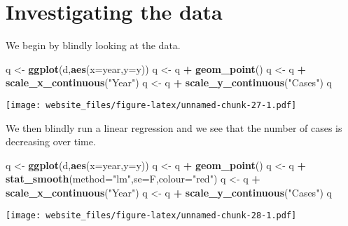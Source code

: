 \documentclass[]{book}
\newenvironment{Shaded}{\begin{snugshade}}{\end{snugshade}}
\newcommand{\KeywordTok}[1]{\textcolor[rgb]{0.13,0.29,0.53}{\textbf{#1}}}
\newcommand{\DataTypeTok}[1]{\textcolor[rgb]{0.13,0.29,0.53}{#1}}
\newcommand{\StringTok}[1]{\textcolor[rgb]{0.31,0.60,0.02}{#1}}
\newcommand{\OperatorTok}[1]{\textcolor[rgb]{0.81,0.36,0.00}{\textbf{#1}}}
\newcommand{\NormalTok}[1]{#1}
\begin{document}
\newpage

\section{Investigating the data}\label{investigating-the-data}

We begin by blindly looking at the data.

\begin{Shaded}
\begin{Highlighting}[]
\NormalTok{q <-}\StringTok{ }\KeywordTok{ggplot}\NormalTok{(d,}\KeywordTok{aes}\NormalTok{(}\DataTypeTok{x=}\NormalTok{year,}\DataTypeTok{y=}\NormalTok{y))}
\NormalTok{q <-}\StringTok{ }\NormalTok{q }\OperatorTok{+}\StringTok{ }\KeywordTok{geom_point}\NormalTok{()}
\NormalTok{q <-}\StringTok{ }\NormalTok{q }\OperatorTok{+}\StringTok{ }\KeywordTok{scale_x_continuous}\NormalTok{(}\StringTok{"Year"}\NormalTok{)}
\NormalTok{q <-}\StringTok{ }\NormalTok{q }\OperatorTok{+}\StringTok{ }\KeywordTok{scale_y_continuous}\NormalTok{(}\StringTok{"Cases"}\NormalTok{)}
\NormalTok{q}
\end{Highlighting}
\end{Shaded}

\texttt{[image: website\_files/figure-latex/unnamed-chunk-27-1.pdf]}

We then blindly run a linear regression and we see that the number of
cases is decreasing over time.

\begin{Shaded}
\begin{Highlighting}[]
\NormalTok{q <-}\StringTok{ }\KeywordTok{ggplot}\NormalTok{(d,}\KeywordTok{aes}\NormalTok{(}\DataTypeTok{x=}\NormalTok{year,}\DataTypeTok{y=}\NormalTok{y))}
\NormalTok{q <-}\StringTok{ }\NormalTok{q }\OperatorTok{+}\StringTok{ }\KeywordTok{geom_point}\NormalTok{()}
\NormalTok{q <-}\StringTok{ }\NormalTok{q }\OperatorTok{+}\StringTok{ }\KeywordTok{stat_smooth}\NormalTok{(}\DataTypeTok{method=}\StringTok{"lm"}\NormalTok{,}\DataTypeTok{se=}\NormalTok{F,}\DataTypeTok{colour=}\StringTok{"red"}\NormalTok{)}
\NormalTok{q <-}\StringTok{ }\NormalTok{q }\OperatorTok{+}\StringTok{ }\KeywordTok{scale_x_continuous}\NormalTok{(}\StringTok{"Year"}\NormalTok{)}
\NormalTok{q <-}\StringTok{ }\NormalTok{q }\OperatorTok{+}\StringTok{ }\KeywordTok{scale_y_continuous}\NormalTok{(}\StringTok{"Cases"}\NormalTok{)}
\NormalTok{q}
\end{Highlighting}
\end{Shaded}

\texttt{[image: website\_files/figure-latex/unnamed-chunk-28-1.pdf]}
\end{document}
